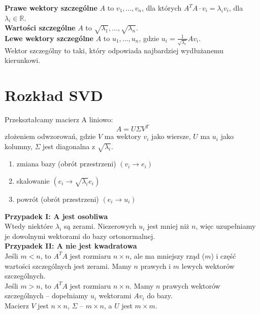 \textbf{Prawe wektory szczególne} \( A \) to \( v_1, \dots, v_n \), dla których \( A^TA \cdot v_i = \lambda_iv_i \), dla \( \lambda_i \in \mathbb{R} \). \\
\textbf{Wartości szczególne} \( A \) to \( \sqrt{\lambda_1}, \dots, \sqrt{\lambda_n} \). \\
\textbf{Lewe wektory szczególne} \( A \) to \( u_1, \dots, u_n \), gdzie \( u_i = \frac{1}{\sqrt{\lambda_i}}A v_i \). \\
Wektor szczególny to taki, który odpowiada najbardziej wydłużanemu kierunkowi.

\section{Rozkład SVD}
Przekształcamy macierz A liniowo:
\[
	A = U\Sigma V^T
\]
złożeniem odwzorowań, gdzie \( V \) ma wektory \( v_i \)  jako wiersze, \( U \) ma \( u_i \) jako kolumny, \( \Sigma \) jest diagonalna z \( \sqrt{\lambda_i} \).
\begin{enumerate}
	\singlespacing
	\item zmiana bazy (obrót przestrzeni) \( (v_i \rightarrow e_i) \)
	\item skalowanie \( (e_i \rightarrow \sqrt{\lambda_i} e_i) \)
	\item powrót (obrót przestrzeni) \( (e_i \rightarrow u_i) \)
\end{enumerate}
\textbf{Przypadek I: A jest osobliwa} \\
Wtedy niektóre \( \lambda_i \) są zerami. Niezerowych \( u_i \) jest mniej niż \( n \), więc uzupełniamy je dowolnymi wektorami do bazy ortonormalnej. \\
\textbf{Przypadek II: A nie jest kwadratowa} \\
Jeśli \( m < n \), to \( A^TA \) jest rozmiaru \( n \times n \), ale ma mniejszy rząd (\( m \)) i część wartości szczególnych jest zerami. Mamy \( n \) prawych i \( m \) lewych wektorów szczególnych. \\
Jeśli \( m > n \), to \( A^TA \) jest rozmiaru \( n \times n \). Mamy \( n \) prawych wektorów szczególnych – dopełniamy \( u_i \) wektorami \( Av_i \) do bazy. \\
Macierz \( V \) jest \( n \times n \), \( \Sigma \) – \( m \times n \), a \( U \) jest \( m \times m \).
